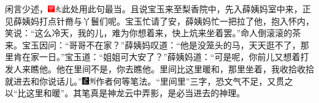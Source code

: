 闲言少述，{\includegraphics[width=3mm]{../Images/00002}\includegraphics[width=3mm]{../Images/00012}\footnotesize \kaishu 此处用此句最当。}且说宝玉来至梨香院中，先入薛姨妈室中来，正见薛姨妈打点针黹与丫鬟们呢。宝玉忙请了安，薛姨妈忙一把拉了他，抱入怀内，笑说：``这么冷天，我的儿，难为你想着来，快上炕来坐着罢。''命人倒滚滚的茶来。宝玉因问：``哥哥不在家？''薛姨妈叹道：``他是没笼头的马，天天逛不了，那里肯在家一日。''宝玉道：``姐姐可大安了？''薛姨妈道：``可是呢，你前儿又想着打发人来瞧他。他在里间不是，你去瞧他。里间比这里暖和，那里坐着，我收拾收拾就进去和你说话儿。''{\includegraphics[width=3mm]{../Images/00006}\includegraphics[width=3mm]{../Images/00011}\footnotesize \kaishu 作者何等笔法。``里间里''三字，恐文气不足，又贯之以``比这里和暖''。其笔真是神龙云中弄影，是必当进去的神理。}

